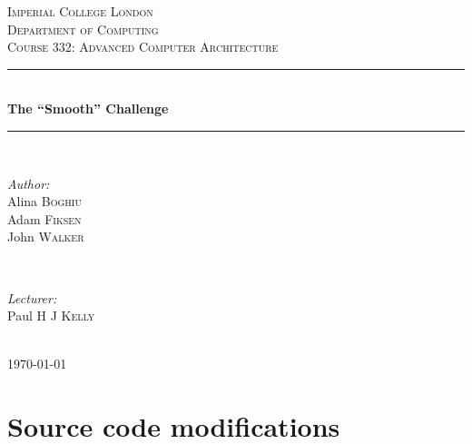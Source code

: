 \documentclass{article}
\begin{document}

\begin{titlepage}
\newcommand{\HRule}{\rule{\linewidth}{0.5mm}}
\center
\textsc{\LARGE Imperial College London}  \\[1.5cm]
\textsc{\Large Department of Computing}  \\[0.5cm]
\textsc{\large Course 332: Advanced Computer Architecture} \\[0.5cm]

\HRule \\[0.6cm]
{\huge \bfseries The ``Smooth'' Challenge} \\[0.3cm]
\HRule \\[1.5cm]

\begin{minipage}{0.4\textwidth}

\begin{flushleft} \large \emph{Author:} \\
Alina  \textsc{Boghiu} \\
Adam  \textsc{Fiksen} \\
John  \textsc{Walker} 
\end{flushleft}

\end{minipage}~
\begin{minipage}{0.4\textwidth}

\begin{flushright} \large \emph{Lecturer:} \\
Paul H J \textsc{Kelly}
\end{flushright}

\end{minipage}\\[4cm]

{\large \today}\\[3cm]
\vfill
\end{titlepage}


\section{Source code modifications}
\end{document}
